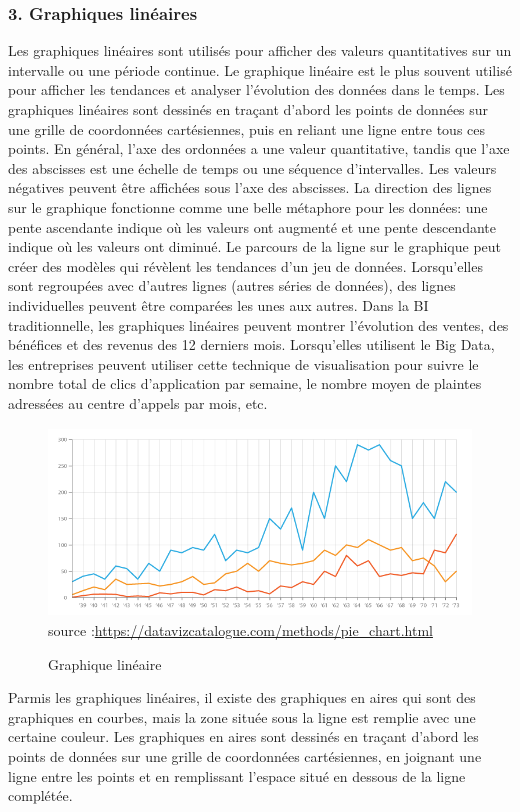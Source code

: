 \documentclass[french, a4paper, 12pt]{report}
\begin{document}
\subsubsection{3. Graphiques linéaires}
Les graphiques linéaires sont utilisés pour afficher des valeurs quantitatives sur un intervalle ou une période continue. Le graphique linéaire est le plus souvent utilisé pour afficher les tendances et analyser l’évolution des données dans le temps.
Les graphiques linéaires sont dessinés en traçant d'abord les points de données sur une grille de coordonnées cartésiennes, puis en reliant une ligne entre tous ces points. En général, l'axe des ordonnées a une valeur quantitative, tandis que l'axe des abscisses est une échelle de temps ou une séquence d'intervalles. Les valeurs négatives peuvent être affichées sous l'axe des abscisses.
La direction des lignes sur le graphique fonctionne comme une belle métaphore pour les données: une pente ascendante indique où les valeurs ont augmenté et une pente descendante indique où les valeurs ont diminué. Le parcours de la ligne sur le graphique peut créer des modèles qui révèlent les tendances d'un jeu de données.
Lorsqu'elles sont regroupées avec d'autres lignes (autres séries de données), des lignes individuelles peuvent être comparées les unes aux autres. 
Dans la BI traditionnelle, les graphiques linéaires peuvent montrer l'évolution des ventes, des bénéfices et des revenus des 12 derniers mois. Lorsqu'elles utilisent le Big Data, les entreprises peuvent utiliser cette technique de visualisation pour suivre le nombre total de clics d'application par semaine, le nombre moyen de plaintes adressées au centre d'appels par mois, etc.
\begin{figure}[!ht]
    \centering
    \includegraphics[height=5cm]{images/line_graph.png}
    \scriptsize{source :\url{https://datavizcatalogue.com/methods/pie_chart.html}}
    \caption{Graphique linéaire}
    \label{fig:2.5}
\end{figure}
Parmis les graphiques linéaires, il existe des graphiques en aires qui sont des graphiques en courbes, mais la zone située sous la ligne est remplie avec une certaine couleur. Les graphiques en aires sont dessinés en traçant d'abord les points de données sur une grille de coordonnées cartésiennes, en joignant une ligne entre les points et en remplissant l'espace situé en dessous de la ligne complétée.
\end{document}
